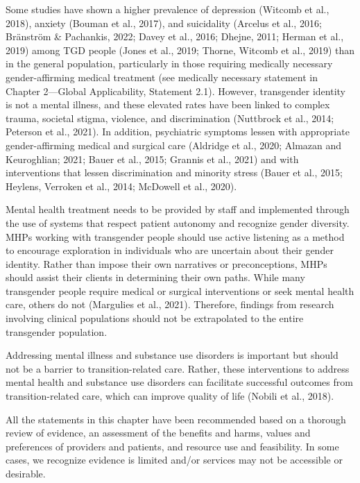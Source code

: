 \documentclass[
]{book}
\begin{document}
Some studies have shown a higher prevalence of
depression (Witcomb et al., 2018), anxiety (Bouman
et al., 2017), and suicidality (Arcelus et al., 2016;
Bränström \& Pachankis, 2022; Davey et al., 2016;
Dhejne, 2011; Herman et al., 2019) among TGD
people (Jones et al., 2019; Thorne, Witcomb et al.,
2019) than in the general population, particularly
in those requiring medically necessary
gender-affirming medical treatment (see medically
necessary statement in Chapter 2---Global
Applicability, Statement 2.1). However, transgender
identity is not a mental illness, and these elevated
rates have been linked to complex trauma, societal
stigma, violence, and discrimination (Nuttbrock
et al., 2014; Peterson et al., 2021). In addition, psychiatric symptoms lessen with appropriate
gender-affirming medical and surgical care (Aldridge
et al., 2020; Almazan and Keuroghlian; 2021; Bauer
et al., 2015; Grannis et al., 2021) and with interventions that lessen discrimination and minority
stress (Bauer et al., 2015; Heylens, Verroken et al.,
2014; McDowell et al., 2020).

Mental health treatment needs to be provided by
staff and implemented through the use of systems
that respect patient autonomy and recognize gender
diversity. MHPs working with transgender people
should use active listening as a method to encourage
exploration in individuals who are uncertain about
their gender identity. Rather than impose their own
narratives or preconceptions, MHPs should assist
their clients in determining their own paths. While
many transgender people require medical or surgical
interventions or seek mental health care, others do
not (Margulies et al., 2021). Therefore, findings from
research involving clinical populations should not
be extrapolated to the entire transgender population.

Addressing mental illness and substance use
disorders is important but should not be a barrier
to transition-related care. Rather, these interventions to address mental health and substance use
disorders can facilitate successful outcomes from
transition-related care, which can improve quality
of life (Nobili et al., 2018).

All the statements in this chapter have been
recommended based on a thorough review of
evidence, an assessment of the benefits and
harms, values and preferences of providers and
patients, and resource use and feasibility. In some
cases, we recognize evidence is limited and/or
services may not be accessible or desirable.
\end{document}
